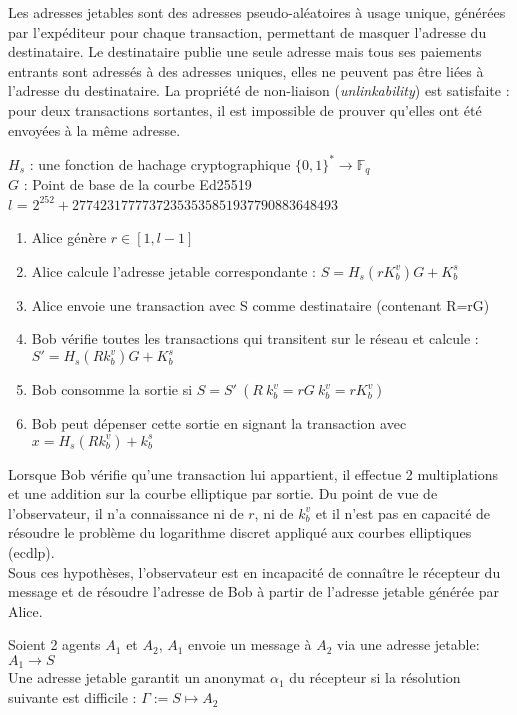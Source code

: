 Les adresses jetables sont des adresses pseudo-aléatoires à usage unique, générées 
par l'expéditeur pour chaque transaction, permettant de masquer l'adresse du 
destinataire. Le destinataire publie une seule adresse mais tous ses paiements 
entrants sont adressés à des adresses uniques, elles ne peuvent pas être liées à 
l'adresse du destinataire. La propriété de non-liaison\cite[1]{monero_wp} 
(\og \textit{unlinkability}\fg) est satisfaite : pour deux transactions sortantes, 
il est impossible de prouver qu’elles ont été envoyées à la même adresse.

\bigskip 
\noindent 
$H_s$ : une fonction de hachage cryptographique $\{0,1\}^* \rightarrow \mathds{F}_q$ \\
$G$ : Point de base de la courbe Ed25519\\
$l$ = $2^{252} + 27742317777372353535851937790883648493$
  
\begin{enumerate}
    \item Alice génère $r \in [1,l-1]$
    \item Alice calcule l'adresse jetable correspondante : $S = H_s(rK^v_b)G + K^s_b$
    \item Alice envoie une transaction avec S comme destinataire (contenant R=rG)
    \item Bob vérifie toutes les transactions qui transitent sur le réseau et calcule : 
    $S'=H_s(Rk^v_b)G + K^s_b$
    \item Bob consomme la sortie si $S = S' \: (R \: k^v_b= rG \: k^v_b = rK^v_b)$
    \item Bob peut dépenser cette sortie en signant la transaction avec $x=H_s(Rk^v_b) + k^s_b$ 
\end{enumerate}

Lorsque Bob vérifie qu'une transaction lui appartient, il effectue 2 multiplations et une addition
sur la courbe elliptique par sortie. Du point de vue de l'observateur, il n'a connaissance ni 
de $r$, ni de $k^v_b$ et il n'est pas en capacité de résoudre le
problème du logarithme discret appliqué aux courbes elliptiques (\acrshort{ecdlp}).\\
Sous ces hypothèses, l'observateur est en incapacité de connaître le récepteur du message et 
de résoudre l'adresse de Bob à partir de l'adresse jetable générée par Alice.

\begin{proposition}
    Soient 2 agents $A_1$ et $A_2$, $A_1$ envoie un message à $A_2$ via une adresse jetable: 
    $A_1 \rightarrow S$\\
    Une adresse jetable garantit un anonymat $\alpha_1$ du récepteur si
    la résolution suivante est difficile :
    $\Gamma := S \mapsto A_2$ 
\end{proposition}



